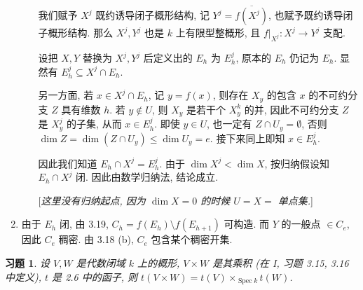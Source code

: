\documentclass{article}
\theoremstyle{exercise}
\newtheorem{exercise}{习题}[section]
\newenvironment{proofc}{\proof}{\endproof}
\def\Spec{\operatorname{Spec}}
\def\dim{\operatorname{dim}}
\def\leq{\leqslant}
\begin{document}
\begin{proofc}
\begin{enumerate}[label={(\alph*)}]
\begin{enumerate}[label={\arabic*.}]
                  我们赋予 $X^j$ 既约诱导闭子概形结构,
                  记 $Y^j = \overline{f(X^j)}$, 也赋予既约诱导闭子概形结构.
                  那么 $X^j, Y^j$ 也是 $k$ 上有限型整概形,
                  且 $f|_{X^j} : X^j \to Y^j$ 支配.

                  设把 $X, Y$ 替换为 $X^j, Y^j$ 后定义出的 $E_h$ 为 $E^j_h$,
                  原本的 $E_h$ 仍记为 $E_h$.
                  显然有 $E^j_h \subseteq X^j \cap E_h$.

                  另一方面, 若 $x \in X^j \cap E_h$, 记 $y = f(x)$,
                  则存在 $X_y$ 的包含 $x$ 的不可约分支 $Z$ 具有维数 $h$.
                  若 $y \notin U$, 则 $X_y$ 是若干个 $X^k_y$ 的并,
                  因此不可约分支 $Z$ 是 $X^j_y$ 的子集, 从而 $x \in E^j_h$.
                  即使 $y \in U$, 也一定有 $Z \cap U_y = \emptyset$,
                  否则 $\dim Z = \dim (Z \cap U_y) \leq \dim U_y = e$.
                  接下来同上即知 $x \in E^j_h$.

                  因此我们知道 $E_h \cap X^j = E^j_h$. 由于 $\dim X^j < \dim X$,
                  按归纳假设知 $E_h \cap X^j$ 闭.
                  因此由数学归纳法, 结论成立.

                  [\emph{这里没有归纳起点, 因为 $\dim X = 0$ 的时候 $U = X = $ 单点集.}]
          \end{enumerate}
    \item 由于 $E_h$ 闭, 由 3.19, $C_h = f(E_h) \setminus f(E_{h + 1})$ 可构造.
          而 $Y$ 的一般点 $\in C_e$, 因此 $C_e$ 稠密.
          由 3.18 (b), $C_e$ 包含某个稠密开集.
          \qedhere
  \end{enumerate}
\end{proofc}

\begin{exercise}
  设 $V, W$ 是代数闭域 $k$ 上的概形, $V \times W$ 是其乘积 (在 I, 习题 3.15, 3.16 中定义),
  $t$ 是 2.6 中的函子, 则 $t(V \times W) = t(V) \times_{\Spec k} t(W)$.
\end{exercise}
\end{document}
